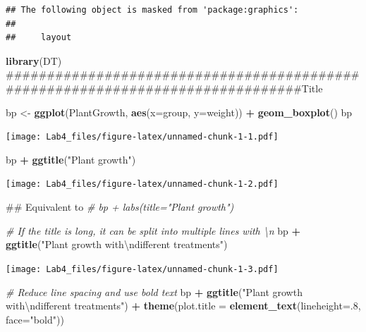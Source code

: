 \documentclass[]{article}
\newenvironment{Shaded}{\begin{snugshade}}{\end{snugshade}}
\newcommand{\KeywordTok}[1]{\textcolor[rgb]{0.13,0.29,0.53}{\textbf{#1}}}
\newcommand{\DataTypeTok}[1]{\textcolor[rgb]{0.13,0.29,0.53}{#1}}
\newcommand{\DecValTok}[1]{\textcolor[rgb]{0.00,0.00,0.81}{#1}}
\newcommand{\CharTok}[1]{\textcolor[rgb]{0.31,0.60,0.02}{#1}}
\newcommand{\StringTok}[1]{\textcolor[rgb]{0.31,0.60,0.02}{#1}}
\newcommand{\CommentTok}[1]{\textcolor[rgb]{0.56,0.35,0.01}{\textit{#1}}}
\newcommand{\OperatorTok}[1]{\textcolor[rgb]{0.81,0.36,0.00}{\textbf{#1}}}
\newcommand{\NormalTok}[1]{#1}
\begin{document}
\begin{verbatim}
## The following object is masked from 'package:graphics':
## 
##     layout
\end{verbatim}

\begin{Shaded}
\begin{Highlighting}[]
\KeywordTok{library}\NormalTok{(DT)}
\NormalTok{###############################################################################Title}

\NormalTok{bp <-}\StringTok{ }\KeywordTok{ggplot}\NormalTok{(PlantGrowth, }\KeywordTok{aes}\NormalTok{(}\DataTypeTok{x=}\NormalTok{group, }\DataTypeTok{y=}\NormalTok{weight)) }\OperatorTok{+}\StringTok{ }\KeywordTok{geom_boxplot}\NormalTok{()}
\NormalTok{bp}
\end{Highlighting}
\end{Shaded}

\texttt{[image: Lab4\_files/figure-latex/unnamed-chunk-1-1.pdf]}

\begin{Shaded}
\begin{Highlighting}[]
\NormalTok{bp }\OperatorTok{+}\StringTok{ }\KeywordTok{ggtitle}\NormalTok{(}\StringTok{"Plant growth"}\NormalTok{)}
\end{Highlighting}
\end{Shaded}

\texttt{[image: Lab4\_files/figure-latex/unnamed-chunk-1-2.pdf]}

\begin{Shaded}
\begin{Highlighting}[]
\NormalTok{## Equivalent to}
\CommentTok{# bp + labs(title="Plant growth")}

\CommentTok{# If the title is long, it can be split into multiple lines with \textbackslash{}n}
\NormalTok{bp }\OperatorTok{+}\StringTok{ }\KeywordTok{ggtitle}\NormalTok{(}\StringTok{"Plant growth with}\CharTok{\textbackslash{}n}\StringTok{different treatments"}\NormalTok{)}
\end{Highlighting}
\end{Shaded}

\texttt{[image: Lab4\_files/figure-latex/unnamed-chunk-1-3.pdf]}

\begin{Shaded}
\begin{Highlighting}[]
\CommentTok{# Reduce line spacing and use bold text}
\NormalTok{bp }\OperatorTok{+}\StringTok{ }\KeywordTok{ggtitle}\NormalTok{(}\StringTok{"Plant growth with}\CharTok{\textbackslash{}n}\StringTok{different treatments"}\NormalTok{) }\OperatorTok{+}\StringTok{ }
\StringTok{     }\KeywordTok{theme}\NormalTok{(}\DataTypeTok{plot.title =} \KeywordTok{element_text}\NormalTok{(}\DataTypeTok{lineheight=}\NormalTok{.}\DecValTok{8}\NormalTok{, }\DataTypeTok{face=}\StringTok{"bold"}\NormalTok{))}
\end{Highlighting}
\end{Shaded}
\end{document}
